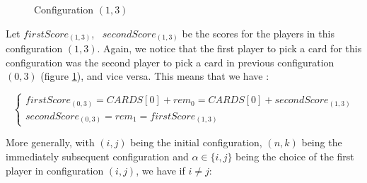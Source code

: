 \documentclass[a4paper,12pt,fleqn]{article}
\newcommand\ezskip{\medskip\noindent}
\begin{document}
\begin{figure}[H]
    \centering
    \caption{Configuration $(1,3)$}
    \label{fig:recursive_04}
\end{figure}

\noindent
Let \texttt{$firstScore_{(1,3)}$}, \ \texttt{$secondScore_{(1,3)}$} be the scores for the players in this configuration $(1,3)$. Again, we notice that the first player to pick a card for this configuration was the second player to pick a card in previous configuration $(0,3)$ (figure \ref{fig:recursive_04}), and vice versa. This means that we have :

    \begin{equation}
    \begin{cases}

    firstScore_{(0,3)} = CARDS[0] + rem_0 = CARDS[0] + secondScore_{(1,3)} \\
    secondScore_{(0,3)} = rem_1 = firstScore_{(1,3)}
    
    \end{cases}
    \end{equation}

\ezskip
More generally, with $(i,j)$ being the initial configuration, $(n,k)$ being the immediately subsequent configuration and $\alpha \in \{i,j\}$ being the choice of the first player in configuration $(i,j)$, we have if $i \neq j$:
\end{document}
